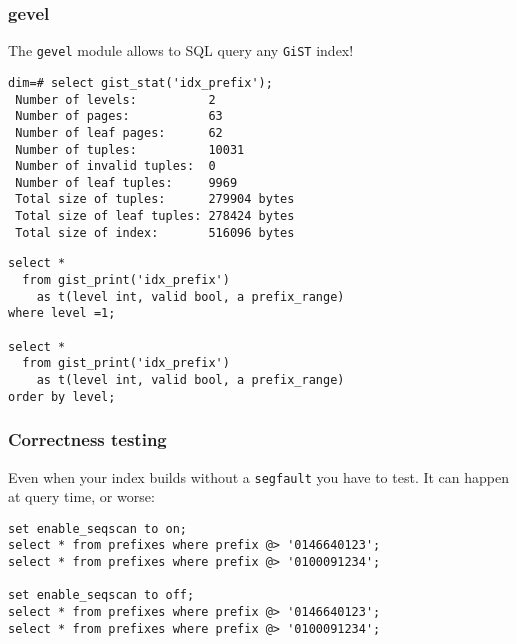 \documentclass{beamer}
\begin{document}
\begin{frame}[fragile]
  \frametitle{gevel}

  The \texttt{gevel} module allows to SQL query any \texttt{GiST} index!

  \begin{example}
  \begin{overprint}

  \begin{verbatim}
dim=# select gist_stat('idx_prefix');
 Number of levels:          2
 Number of pages:           63
 Number of leaf pages:      62
 Number of tuples:          10031
 Number of invalid tuples:  0
 Number of leaf tuples:     9969
 Total size of tuples:      279904 bytes
 Total size of leaf tuples: 278424 bytes
 Total size of index:       516096 bytes
  \end{verbatim}

  \begin{verbatim}
select *
  from gist_print('idx_prefix')
    as t(level int, valid bool, a prefix_range)
where level =1;

select *
  from gist_print('idx_prefix')
    as t(level int, valid bool, a prefix_range)
order by level;
  \end{verbatim}

  \end{overprint}
  \end{example}
\end{frame}

\begin{frame}[fragile]
  \frametitle{Correctness testing}

  Even when your index builds without a \texttt{segfault} you have to
  test. It can happen at query time, or worse:
  \pause

  \begin{example}
  \begin{verbatim}
set enable_seqscan to on;
select * from prefixes where prefix @> '0146640123';
select * from prefixes where prefix @> '0100091234';

set enable_seqscan to off;
select * from prefixes where prefix @> '0146640123';
select * from prefixes where prefix @> '0100091234';
  \end{verbatim}
  \end{example}
\end{frame}
\end{document}
